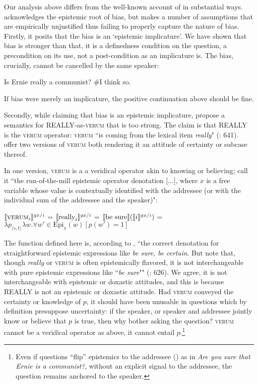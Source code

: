 \documentclass[output=paper,colorlinks,citecolor=brown]{langscibook}
\begin{document}
Our analysis above differs from the well-known account of \citet{romero2004} in substantial ways. \citet{romero2004}  acknowledges the epistemic root of bias, but makes a number of assumptions that are empirically unjustified thus failing to properly capture the nature of bias. Firstly, it posits that the bias is an `epistemic implicature'. We have shown that bias is stronger than that, it is a definedness condition on the question, a precondition on its use, not a post-condition as an implicature is. The bias, crucially, cannot be cancelled by the same speaker:

\ea Is Ernie really a communist? \#I think so. 
\z


If bias were merely an implicature, the positive continuation  above should be fine. 
 
Secondly, while claiming that bias is an epistemic implicature,  \citet{romero2004} propose a semantics for \textsc{REALLY}-as-\textsc{verum} that is too strong. The claim is that \textsc{REALLY} is the \textsc{verum} operator: \textsc{verum} ``is coming from the lexical item \textit{really}" (\citealt{romero2004}: 641). \citet{romero2004} offer two versions of \textsc{verum} both rendering it an attitude of certainty or subcase thereof. 

In one version, \textsc{verum} is a a veridical operator akin to knowing or believing; \citet{romero2004} call it  ``the run-of-the-mill epistemic operator denotation [...], where $x$ is a free variable whose value is contextually identified with the addressee (or with the individual sum of the addressee and the speaker)": 


\ea  $\llbracket\textsc{verum}_i\rrbracket\textsuperscript{\ensuremath{gx/i}}$ =  $\llbracket\text{really}_i\rrbracket\textsuperscript{\ensuremath{gx/i}}$ = $\llbracket\text{be sure}\rrbracket(\llbracket i\rrbracket\textsuperscript{\ensuremath{gx/i}})$  = \\ $\lambda p _{{\langle}s,t{\rangle}} \lambda w.\forall w' \in \text{Epi}_x (w) [p(w') = 1]$ 
\z

The function defined here is, according to \citet{romero2004}, ``the correct denotation for straightforward epistemic expressions like \textit{be sure, be certain}.   But note that, though \textit{really} or \textsc{verum} is often epistemically flavored, it is not interchangeable with pure epistemic expressions like ``\textit{be sure}"" (\citealt{romero2004}: 626). We agree, it is not interchangeable with epistemic or doxastic attitudes, and this is because \textsc{REALLY} is not an epistemic or doxastic attitude. Had \textsc{verum} conveyed the certainty or knowledge of $p$,  it should have been unusable in questions which by definition presuppose uncertainty: if the speaker, or speaker and addressee jointly know or believe that $p$ is true, then why bother asking the question? \textsc{verum} cannot be a veridical operator as above, it cannot entail $p$.\footnote{Even if questions ``flip'' epistemics to the addressee (\citealt{eckardt2019}) as in \textit{Are you sure that Ernie is a communist?}, without  an explicit signal to the addressee, the question remains anchored to the speaker.}
\end{document}

